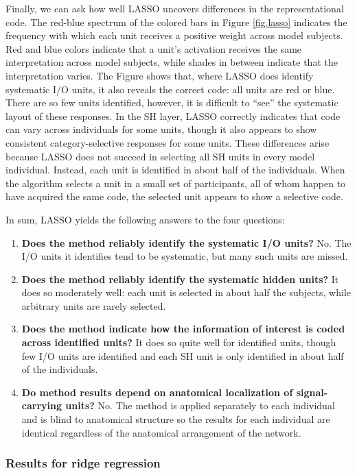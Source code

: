 Finally, we can ask how well LASSO uncovers differences in the representational code. The red-blue spectrum of the colored bars in Figure \ref{fig.lasso} indicates the frequency with which each unit receives a positive weight across model subjects. Red and blue colors indicate that a unit's activation receives the same interpretation across model subjects, while shades in between indicate that the interpretation varies. The Figure shows that, where LASSO does identify systematic I/O units, it also reveals the correct code: all units are red or blue. There are so few units identified, however, it is difficult to ``see'' the systematic layout of these responses. In the SH layer, LASSO correctly indicates that code can vary across individuals for some units, though it also appears to show consistent category-selective responses for some units. These differences arise because LASSO does not succeed in selecting all SH units in every model individual. Instead, each unit is identified in about half of the individuals. When the algorithm selects a unit in a small set of participants, all of whom happen to have acquired the same code, the selected unit appears to show a selective code.

In sum, LASSO yields the following answers to the four questions:
\begin{enumerate}
\item {\bf Does the method reliably identify the systematic I/O units?} No. The I/O units it identifies tend to be systematic, but many such units are missed.
\item {\bf Does the method reliably identify the systematic hidden units?} It does so moderately well: each unit is selected in about half the subjects, while arbitrary units are rarely selected.
\item {\bf Does the method indicate how the information of interest is coded across identified units?} It does so quite well for identified units, though few I/O units are identified and each SH unit is only identified in about half of the individuals.
\item {\bf Do method results depend on anatomical localization of signal-carrying units?} No. The method is applied separately to each individual and is blind to anatomical structure so the results for each individual are identical regardless of the anatomical arrangement of the network.
\end{enumerate}

\subsubsection{Results for ridge regression}

